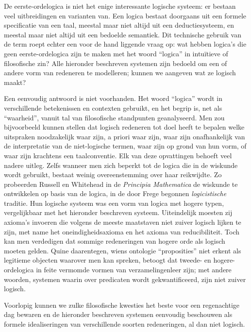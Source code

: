 \documentclass[../../../include/open-logic-section]{subfiles}
\begin{document}


De eerste-ordelogica is niet het enige interessante logische systeem:
er bestaan veel uitbreidingen en varianten van. Een logica bestaat
doorgaans uit een formele specificatie van een taal, meestal maar niet
altijd uit een deductiesysteem, en meestal maar niet altijd uit een
bedoelde semantiek. Dit technische gebruik van de term roept echter een
voor de hand liggende vraag op: wat hebben logica's die geen
eerste-ordelogica zijn te maken met het woord ``logica'' in intuïtieve
of filosofische zin? Alle hieronder beschreven systemen zijn bedoeld
om een of andere vorm van redeneren te modelleren; kunnen we aangeven
wat ze logisch maakt?

Een eenvoudig antwoord is niet voorhanden. Het woord ``logica'' wordt
in verschillende betekenissen en contexten gebruikt, en het begrip is,
net als ``waarheid'', vanuit tal van filosofische standpunten
geanalyseerd. Men zou bijvoorbeeld kunnen stellen dat logisch redeneren
tot doel heeft te bepalen welke uitspraken noodzakelijk waar zijn, a
priori waar zijn, waar zijn onafhankelijk van de interpretatie van de
niet-logische termen, waar zijn op grond van hun vorm, of waar zijn
krachtens een taalconventie. Elk van deze opvattingen behoeft veel
nadere uitleg. Zelfs wanneer men zich beperkt tot de logica die in de
wiskunde wordt gebruikt, bestaat weinig overeenstemming over haar
reikwijdte. Zo probeerden Russell en Whitehead in de
\textit{Principia Mathematica} de wiskunde te ontwikkelen op basis van
de logica, in de door Frege begonnen {\em logicistische} traditie. Hun
logische systeem was een vorm van logica met hogere typen, vergelijkbaar
met het hieronder beschreven systeem. Uiteindelijk moesten zij axioma's
invoeren die volgens de meeste maatstaven niet zuiver logisch lijken te
zijn, met name het oneindigheidsaxioma en het axioma van reducibiliteit.
Toch kan men verdedigen dat sommige redeneringen van hogere orde als
logisch moeten gelden. Quine daarentegen, wiens ontologie
``proposities'' niet erkent als legitieme objecten waarover men kan
spreken, betoogt dat tweede- en hogere-ordelogica in feite vermomde
vormen van verzamelingenleer zijn; met andere woorden, systemen waarin
over predicaten wordt gekwantificeerd, zijn niet zuiver logisch.

Voorlopig kunnen we zulke filosofische kwesties het beste voor een
regenachtige dag bewaren en de hieronder beschreven systemen eenvoudig
beschouwen als formele idealiseringen van verschillende soorten
redeneringen, al dan niet logisch.
\end{document}
